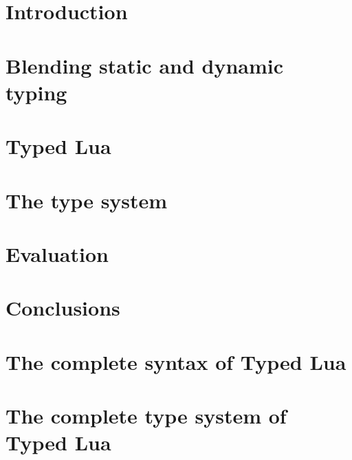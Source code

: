 \documentclass[pdftex,12pt,a4paper]{report}
\begin{document}
\newpage
{}

\chapter{Introduction}
\label{chap:intro}


\chapter{Blending static and dynamic typing}
\label{chap:review}


\chapter{Typed Lua}
\label{chap:typedlua}


\chapter{The type system}
\label{chap:system}


\chapter{Evaluation}
\label{chap:evaluation}


\chapter{Conclusions}
\label{chap:conc}





\appendix

\chapter{The complete syntax of Typed Lua}
\label{app:syntax}


\chapter{The complete type system of Typed Lua}
\label{app:rules}

\end{document}
